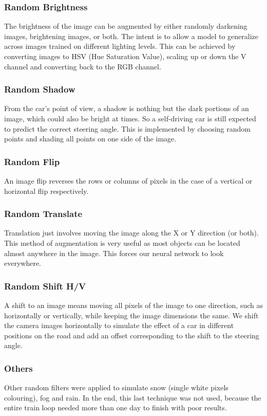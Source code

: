 \documentclass[10pt,twocolumn,letterpaper]{article}
\begin{document}
\subsubsection{Random Brightness} 
The brightness of the image can be augmented by either randomly darkening images, brightening images, or both. The intent is to allow a model to generalize across images trained on different lighting levels. This can be achieved by converting images to HSV (Hue Saturation Value), scaling up or down the V channel and converting back to the RGB channel.

\subsubsection{Random Shadow}
From the car's point of view, a shadow is nothing but the dark portions of an image, which could also be bright at times. So a self-driving car is still expected to predict the correct steering angle. This is implemented by choosing random points and shading all points on one side of the image.

\subsubsection{Random Flip}
An image flip reverses the rows or columns of pixels in the case of a vertical or horizontal flip respectively.

\subsubsection{Random Translate}
Translation just involves moving the image along the X or Y direction (or both). This method of augmentation is very useful as most objects can be located almost anywhere in the image. This forces our neural network to look everywhere.

\subsubsection{Random Shift H/V}
A shift to an image means moving all pixels of the image to one direction, such as horizontally or vertically, while keeping the image dimensions the same. We shift the camera images horizontally to simulate the effect of a car in different positions on the road and add an offset corresponding to the shift to the steering angle.

\subsubsection{Others}
Other random filters were applied to simulate snow (single white pixels colouring), fog and rain. In the end, this last technique was not used, because the entire train loop needed more than one day to finish with poor results.
\end{document}

